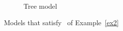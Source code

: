 \begin{figure}
\begin{subfigure}{.5\textwidth}
\begin{tikzpicture}[->,circle,draw,node distance=2.4cm,fill=black
                   ]
\end{tikzpicture} 
        \vspace{2mm}
              \caption{Tree model}
                \label{example_tree-like}
    \end{subfigure}
    \caption{Models that satisfy \formula~of Example~\ref{ex2}}
    \label{example_models}
\end{figure}

